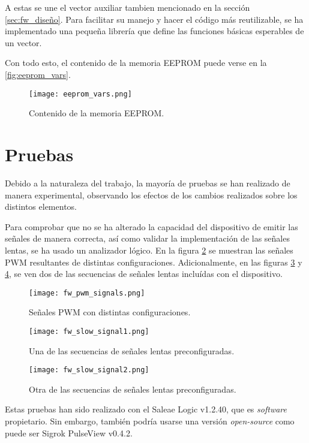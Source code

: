 A estas se une el vector auxiliar tambien mencionado en la sección \ref{sec:fw_diseño}. Para facilitar su manejo y hacer el código más reutilizable, se ha implementado una pequeña librería que define las funciones básicas esperables de un vector.

Con todo esto, el contenido de la memoria EEPROM puede verse en la \autoref{fig:eeprom_vars}.

\begin{figure}[h!]
    \centering
    \texttt{[image: eeprom\_vars.png]}
    \caption{Contenido de la memoria EEPROM.}
    \label{fig:eeprom_vars}
\end{figure}

\section{Pruebas}

Debido a la naturaleza del trabajo, la mayoría de pruebas se han realizado de manera experimental, observando los efectos de los cambios realizados sobre los distintos elementos.

Para comprobar que no se ha alterado la capacidad del dispositivo de emitir las señales de manera correcta, así como validar la implementación de las señales lentas, se ha usado un analizador lógico. En la figura \ref{fig:fw_pwm_signals} se muestran las señales PWM resultantes de distintas configuraciones. Adicionalmente, en las figuras \ref{fig:fw_slow_signal1} y \ref{fig:fw_slow_signal2}, se ven dos de las secuencias de señales lentas incluídas con el dispositivo.

\begin{figure}[h!]
    \centering
    \texttt{[image: fw\_pwm\_signals.png]}
    \caption{Señales PWM con distintas configuraciones.}
    \label{fig:fw_pwm_signals}
\end{figure}

\begin{figure}[h!]
    \centering
    \texttt{[image: fw\_slow\_signal1.png]}
    \caption{Una de las secuencias de señales lentas preconfiguradas.}
    \label{fig:fw_slow_signal1}
\end{figure}

\begin{figure}[h!]
    \centering
    \texttt{[image: fw\_slow\_signal2.png]}
    \caption{Otra de las secuencias de señales lentas preconfiguradas.}
    \label{fig:fw_slow_signal2}
\end{figure}

Estas pruebas han sido realizado con el Saleae Logic v1.2.40\cite{saleae-logic}, que es \textit{software} propietario. Sin embargo, también podría usarse una versión \textit{open-source} como puede ser Sigrok PulseView v0.4.2\cite{sigrok-pv}.

